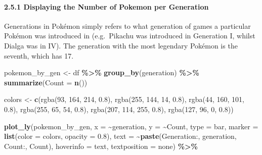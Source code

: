 \documentclass[
]{article}
\newenvironment{Shaded}{\begin{snugshade}}{\end{snugshade}}
\newcommand{\AttributeTok}[1]{\textcolor[rgb]{0.13,0.29,0.53}{#1}}
\newcommand{\FloatTok}[1]{\textcolor[rgb]{0.00,0.00,0.81}{#1}}
\newcommand{\FunctionTok}[1]{\textcolor[rgb]{0.13,0.29,0.53}{\textbf{#1}}}
\newcommand{\NormalTok}[1]{#1}
\newcommand{\OtherTok}[1]{\textcolor[rgb]{0.56,0.35,0.01}{#1}}
\newcommand{\SpecialCharTok}[1]{\textcolor[rgb]{0.81,0.36,0.00}{\textbf{#1}}}
\newcommand{\StringTok}[1]{\textcolor[rgb]{0.31,0.60,0.02}{#1}}
\begin{document}
\paragraph{2.5.1 Displaying the Number of Pokemon per
Generation}\label{displaying-the-number-of-pokemon-per-generation}

Generations in Pokémon simply refers to what generation of games a
particular Pokémon was introduced in (e.g.~Pikachu was introduced in
Generation I, whilst Dialga was in IV). The generation with the most
legendary Pokémon is the seventh, which has 17.

\begin{Shaded}
\begin{Highlighting}[]
\NormalTok{pokemon\_by\_gen }\OtherTok{\textless{}{-}}\NormalTok{ df }\SpecialCharTok{\%\textgreater{}\%}
  \FunctionTok{group\_by}\NormalTok{(generation) }\SpecialCharTok{\%\textgreater{}\%}
  \FunctionTok{summarize}\NormalTok{(}\AttributeTok{Count =} \FunctionTok{n}\NormalTok{())}

\NormalTok{colors }\OtherTok{\textless{}{-}} \FunctionTok{c}\NormalTok{(}\StringTok{\textquotesingle{}rgba(93, 164, 214, 0.8)\textquotesingle{}}\NormalTok{, }\StringTok{\textquotesingle{}rgba(255, 144, 14, 0.8)\textquotesingle{}}\NormalTok{, }\StringTok{\textquotesingle{}rgba(44, 160, 101, 0.8)\textquotesingle{}}\NormalTok{, }
            \StringTok{\textquotesingle{}rgba(255, 65, 54, 0.8)\textquotesingle{}}\NormalTok{, }\StringTok{\textquotesingle{}rgba(207, 114, 255, 0.8)\textquotesingle{}}\NormalTok{, }\StringTok{\textquotesingle{}rgba(127, 96, 0, 0.8)\textquotesingle{}}\NormalTok{)}

\FunctionTok{plot\_ly}\NormalTok{(pokemon\_by\_gen, }\AttributeTok{x =} \SpecialCharTok{\textasciitilde{}}\NormalTok{generation, }\AttributeTok{y =} \SpecialCharTok{\textasciitilde{}}\NormalTok{Count,}
        \AttributeTok{type =} \StringTok{\textquotesingle{}bar\textquotesingle{}}\NormalTok{,}
        \AttributeTok{marker =} \FunctionTok{list}\NormalTok{(}\AttributeTok{color =}\NormalTok{ colors, }\AttributeTok{opacity =} \FloatTok{0.8}\NormalTok{),}
        \AttributeTok{text =} \SpecialCharTok{\textasciitilde{}}\FunctionTok{paste}\NormalTok{(}\StringTok{\textquotesingle{}Generation:\textquotesingle{}}\NormalTok{, generation, }\StringTok{\textquotesingle{}Count:\textquotesingle{}}\NormalTok{, Count),}
        \AttributeTok{hoverinfo =} \StringTok{\textquotesingle{}text\textquotesingle{}}\NormalTok{,}
        \AttributeTok{textposition =} \StringTok{\textquotesingle{}none\textquotesingle{}}\NormalTok{) }\SpecialCharTok{\%\textgreater{}\%}
  

\end{Highlighting}
\end{Shaded}
\end{document}
